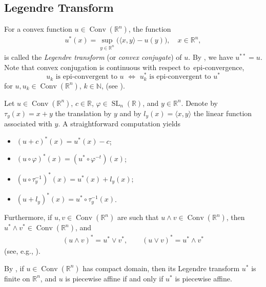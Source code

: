 \documentclass[11pt]{article}
\theoremstyle{definition} %
\DeclareMathOperator{\V}{SL}
\newcommand{\N}{_n(\mathbb{R})}
\DeclareMathOperator{\Conv}{Conv}
\begin{document}
\subsection{Legendre Transform}
For a convex function $u\in \Conv(\mathbb{R}^n)$, the function 
\begin{align*}
    u^*(x)=\sup_{y\in\mathbb{R}^n}  \big(\langle x,y \rangle - u(y)\big), \quad x \in\mathbb{R}^n,
\end{align*}
is called the \textit{Legendre transform} (or \textit{convex conjugate}) of $u$.  By \cite[Theorem 1.4.1]{balestro2024convexity}, we have $u^{**}=u$. Note that convex conjugation is continuous with respect to\ epi-convergence,
\begin{equation}\label{epi}
   u_k \text{ is epi-convergent to } u\,\,\Leftrightarrow\,\, u^*_k \text{ is epi-convergent to } u^*
\end{equation}
for $u, u_k\in \Conv(\mathbb{R}^n)$, $k\in\mathbb{N}$,  (see \cite[Theorem 11.43]{rockafellar2009variational}). 
\medskip

 

Let $u \in \Conv(\mathbb{R}^n)$, $c \in \mathbb{R}$, $\varphi \in \V\N$, and $y \in \mathbb{R}^n$. Denote by $\tau_{y}(x)=x+y$ the translation by $y$ and by $l_y(x)=\langle x,y\rangle$ the linear function associated with $y$. A straightforward computation yields
\begin{itemize}
    \item[(1)] $(u+c)^*(x)=u^*(x)-c$;
    \item[(2)] $(u\circ\varphi)^*(x)=(u^*\circ\varphi^{-t})(x)$;
    \item[(3)] $(u\circ\tau_y^{-1})^*(x) = u^*(x)+l_y(x)$;
    \item[(4)] $(u+l_y)^*(x)= u^*\circ\tau_y^{-1}(x)$.
\end{itemize}
Furthermore, if $u,v\in \Conv(\mathbb{R}^n)$ are such that $u\wedge v\in \Conv(\mathbb{R}^n)$, then  $u^*\wedge v^*\in \Conv(\mathbb{R}^n)$,  and
\begin{align}\label{duall}
(u \wedge v)^* = u^* \vee v^*, 
\qquad 
(u \vee v)^* = u^* \wedge v^*
\end{align}
(see, e.g., \cite[Lemma 3.4 and Proposition 3.5]{colesanti2020hessian}).


By \cite[Theorem 11.14]{rockafellar2009variational}, if $u\in \Conv(\mathbb{R}^n)$ has compact domain, then its Legendre transform $u^*$ is finite on $\mathbb{R}^n$, and $u$ is piecewise affine if and only if $u^*$ is piecewise affine.
\end{document}
